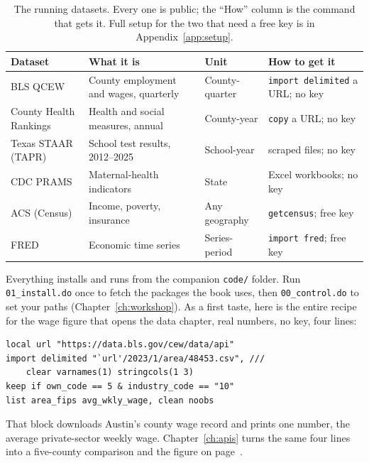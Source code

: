 \documentclass[
    a4paper,
    fontsize=10pt,
    twoside=true,
    numbers=noenddot,
]{kaobook}
\begin{document}
\begin{table}[htbp]
\centering
\footnotesize
\caption[The book's running datasets]{The running datasets. Every one is public; the ``How'' column is the command that gets it. Full setup for the two that need a free key is in Appendix~\ref{app:setup}.}
\label{tab:data}
\begin{tabular}{@{}p{2.5cm}p{3.4cm}p{2.1cm}p{3.0cm}@{}}
\hline
\textbf{Dataset} & \textbf{What it is} & \textbf{Unit} & \textbf{How to get it} \\
\hline
BLS QCEW & County employment and wages, quarterly & County-quarter & \texttt{import delimited} a URL; no key \\
County Health Rankings & Health and social measures, annual & County-year & \texttt{copy} a URL; no key \\
Texas STAAR (TAPR) & School test results, 2012--2025 & School-year & scraped files; no key \\
CDC PRAMS & Maternal-health indicators & State & Excel workbooks; no key \\
ACS (Census) & Income, poverty, insurance & Any geography & \texttt{getcensus}; free key \\
FRED & Economic time series & Series-period & \texttt{import fred}; free key \\
\hline
\end{tabular}
\end{table}

Everything installs and runs from the companion \texttt{code/} folder. Run \texttt{01\_install.do} once to fetch the packages the book uses, then \texttt{00\_control.do} to set your paths (Chapter~\ref{ch:workshop}). As a first taste, here is the entire recipe for the wage figure that opens the data chapter, real numbers, no key, four lines:
{\footnotesize
\begin{verbatim}
local url "https://data.bls.gov/cew/data/api"
import delimited "`url'/2023/1/area/48453.csv", ///
    clear varnames(1) stringcols(1 3)
keep if own_code == 5 & industry_code == "10"
list area_fips avg_wkly_wage, clean noobs
\end{verbatim}
}
That block downloads Austin's county wage record and prints one number, the average private-sector weekly wage. Chapter~\ref{ch:apis} turns the same four lines into a five-county comparison and the figure on page~\pageref{fig:qcew}.
\end{document}
